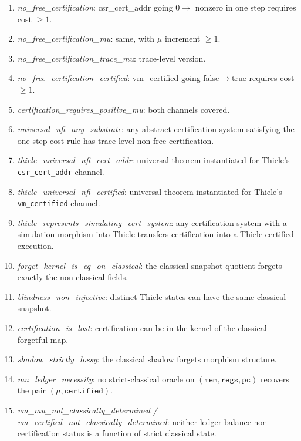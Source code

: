 \documentclass[11pt,a4paper]{article}
\theoremstyle{plain}
\theoremstyle{definition}
\theoremstyle{remark}
\begin{document}
{\small\raggedright{}\emergencystretch=15pt
\begin{enumerate}
\item \textit{\small no\_free\_certification}: csr\_cert\_addr going $0 \to$ nonzero in one step requires cost $\geq 1$.
\item \textit{\small no\_free\_certification\_mu}: same, with $\mu$ increment $\geq 1$.
\item \textit{\small no\_free\_certification\_trace\_mu}: trace-level version.
\item \textit{\small no\_free\_certification\_certified}: vm\_certified going false$\to$true requires cost $\geq 1$.
\item \textit{\small certification\_requires\_positive\_mu}: both channels covered.
\item \textit{\small universal\_nfi\_any\_substrate}: any abstract certification system satisfying the one-step cost rule has trace-level non-free certification.
\item \textit{\small thiele\_universal\_nfi\_cert\_addr}: universal theorem instantiated for Thiele's \texttt{csr\_cert\_addr} channel.
\item \textit{\small thiele\_universal\_nfi\_certified}: universal theorem instantiated for Thiele's \texttt{vm\_certified} channel.
\item \textit{\small thiele\_represents\_simulating\_cert\_system}: any certification system with a simulation morphism into Thiele transfers certification into a Thiele certified execution.
\item \textit{\small forget\_kernel\_is\_eq\_on\_classical}: the classical snapshot quotient forgets exactly the non-classical fields.
\item \textit{\small blindness\_non\_injective}: distinct Thiele states can have the same classical snapshot.
\item \textit{\small certification\_is\_lost}: certification can be in the kernel of the classical forgetful map.
\item \textit{\small shadow\_strictly\_lossy}: the classical shadow forgets morphism structure.
\item \textit{\small mu\_ledger\_necessity}: no strict-classical oracle on $(\texttt{mem}, \texttt{regs}, \texttt{pc})$ recovers the pair $(\mu, \texttt{certified})$.
\item \textit{\small vm\_mu\_not\_classically\_determined / vm\_certified\_not\_classically\_determined}: neither ledger balance nor certification status is a function of strict classical state.

\end{enumerate}}
\end{document}
